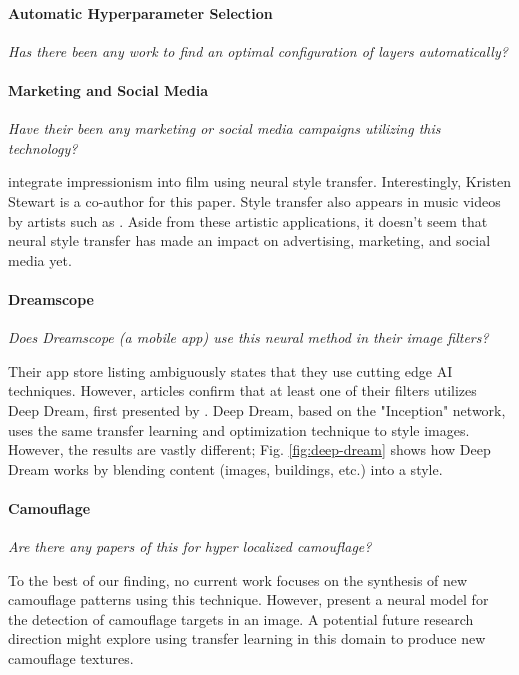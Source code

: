 \documentclass{article}
\begin{document}
\paragraph{Automatic Hyperparameter Selection} \textit{Has there been any
work to find an optimal configuration of layers automatically?}


\paragraph{Marketing and Social Media} \textit{Have their been any marketing
or social media campaigns utilizing this technology?}

\cite{2017arXiv170104928J} integrate impressionism into film using neural
style transfer. Interestingly, Kristen Stewart is a co-author for this paper.
Style transfer also appears in music videos by artists such as \cite{MGMT}.
Aside from these artistic applications, it doesn't seem that neural style
transfer has made an impact on advertising, marketing, and social media yet.

\paragraph{Dreamscope} \textit{Does Dreamscope (a mobile app) use this
neural method in their image filters?}

Their app store listing ambiguously states that they use cutting edge AI
techniques. However, articles confirm that at least one of their filters
utilizes Deep Dream, first presented by \cite{deep-dream}. Deep Dream, based
on the "Inception" network, uses the same transfer learning and optimization
technique to style images. However, the results are vastly different; Fig.
\ref{fig:deep-dream} shows how Deep Dream works by blending content (images,
buildings, etc.) into a style.

\paragraph{Camouflage} \textit{Are there any papers of this for hyper
localized camouflage?}

To the best of our finding, no current work focuses on the synthesis of new
camouflage patterns using this technique. However, \cite{camo-nn} present a
neural model for the detection of camouflage targets in an image. A potential
future research direction might explore using transfer learning in this domain
to produce new camouflage textures.
\end{document}
